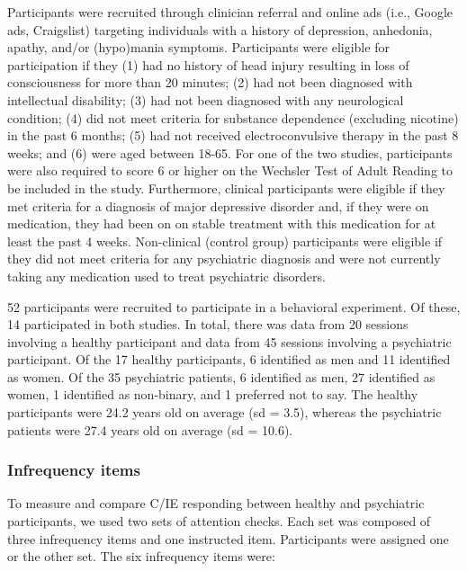 \documentclass[a4paper,notitlepage,12pt]{article}
\begin{document}
Participants were recruited through clinician referral and online ads (i.e., Google ads, Craigslist) targeting individuals with a history of depression, anhedonia, apathy, and/or (hypo)mania symptoms. Participants were eligible for participation if they (1) had no history of head injury resulting in loss of consciousness for more than 20 minutes; (2) had not been diagnosed with intellectual disability; (3) had not been diagnosed with any neurological condition; (4) did not meet criteria for substance dependence (excluding nicotine) in the past 6 months; (5) had not received electroconvulsive therapy in the past 8 weeks; and (6) were aged between 18-65. For one of the two studies, participants were also required to score 6 or higher on the Wechsler Test of Adult Reading to be included in the study. Furthermore, clinical participants were eligible if they met criteria for a diagnosis of major depressive disorder and, if they were on medication, they had been on on stable treatment with this medication for at least the past 4 weeks. Non-clinical (control group) participants were eligible if they did not meet criteria for any psychiatric diagnosis and were not currently taking any medication used to treat psychiatric disorders.

52 participants were recruited to participate in a behavioral experiment. Of these, 14 participated in both studies. In total, there was data from 20 sessions involving a healthy participant and data from 45 sessions involving a psychiatric participant. Of the 17 healthy participants, 6 identified as men and 11 identified as women. Of the 35 psychiatric patients, 6 identified as men, 27 identified as women, 1 identified as non-binary, and 1 preferred not to say. The healthy participants were 24.2 years old on average (sd = 3.5), whereas the psychiatric patients were 27.4 years old on average (sd = 10.6).

\subsubsection*{Infrequency items}

To measure and compare C/IE responding between healthy and psychiatric participants, we used two sets of attention checks. Each set was composed of three infrequency items and one instructed item. Participants were assigned one or the other set. The six infrequency items were:
\end{document}
